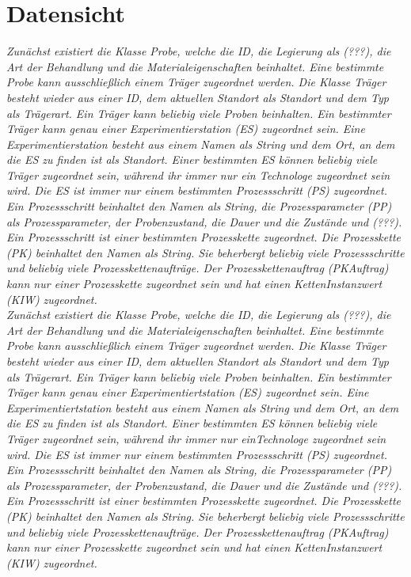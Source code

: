 \documentclass[enabledeprecatedfontcommands,fontsize=12pt,paper=a4,twoside]{scrartcl}
\begin{document}
\section{Datensicht}
\label{sec:datensicht}

{ \em Zunächst existiert die Klasse Probe, welche die ID, die Legierung als (???), die Art der Behandlung und die Materialeigenschaften beinhaltet. Eine bestimmte Probe kann ausschließlich einem Träger zugeordnet werden. 
Die Klasse Träger besteht wieder aus einer ID, dem aktuellen Standort als  Standort und dem Typ als Trägerart. Ein Träger kann beliebig viele Proben beinhalten. Ein bestimmter Träger kann genau einer Experimentierstation (ES) zugeordnet sein. Eine Experimentierstation besteht aus einem Namen als String und dem Ort, an dem die ES zu finden ist als Standort. Einer bestimmten ES können beliebig viele Träger zugeordnet sein, während ihr immer nur ein  Technologe zugeordnet sein wird. Die ES ist immer nur einem bestimmten Prozessschritt (PS) zugeordnet. Ein Prozessschritt beinhaltet den Namen als String, die Prozessparameter (PP) als Prozessparameter, der Probenzustand, die Dauer und die Zustände und (???). Ein Prozessschritt ist einer bestimmten Prozesskette zugeordnet. Die Prozesskette (PK) beinhaltet den Namen als String. Sie beherbergt beliebig viele Prozessschritte und beliebig viele Prozesskettenaufträge. Der  Prozesskettenauftrag (PKAuftrag) kann nur einer Prozesskette zugeordnet sein und hat einen KettenInstanzwert (KIW) zugeordnet. \\

{  Zunächst existiert die Klasse Probe, welche die ID, die Legierung als (???), die Art der Behandlung und die Materialeigenschaften beinhaltet. Eine bestimmte Probe kann ausschließlich einem Träger zugeordnet werden.
Die Klasse Träger besteht wieder aus einer ID, dem aktuellen Standort als  Standort und dem Typ als Trägerart. Ein Träger kann beliebig viele Proben beinhalten. Ein bestimmter Träger kann genau einer Experimentiertstation (ES) zugeordnet sein. Eine Experimentiertstation besteht aus einem Namen als String und dem Ort, an dem die ES zu finden ist als Standort. Einer bestimmten ES können beliebig viele Träger zugeordnet sein, während ihr immer nur einTechnologe zugeordnet sein wird. Die ES ist immer nur einem bestimmten Prozessschritt (PS) zugeordnet. Ein Prozessschritt beinhaltet den Namen als String, die Prozessparameter (PP) als Prozessparameter, der Probenzustand, die Dauer und die Zustände und (???). Ein Prozessschritt ist einer bestimmten Prozesskette zugeordnet. Die Prozesskette (PK) beinhaltet den Namen als String. Sie beherbergt beliebig viele Prozessschritte und beliebig viele Prozesskettenaufträge. Der  Prozesskettenauftrag (PKAuftrag) kann nur einer Prozesskette zugeordnet sein und hat einen KettenInstanzwert (KIW) zugeordnet. \\


}}
\end{document}
